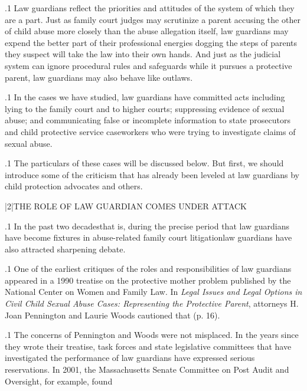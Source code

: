 \documentclass[11pt, twoside]{article}
\begin{document}
{\p.1{%
Law guardians reflect the priorities and attitudes of the system of
which they are a part. Just as family court judges may scrutinize a parent
accusing the other of child abuse more closely than the abuse allegation
itself, law guardians may expend the better part of their professional energies dogging the steps of parents they suspect will take the law into
their own hands. And just as the judicial system can ignore procedural
rules and safeguards while it pursues a protective parent, law guardians
may also behave like outlaws.
}%

\p.1{%
In the cases we have studied, law guardians have committed acts
including lying to the family court and to higher courts; suppressing
evidence of sexual abuse; and communicating false or incomplete information to state prosecutors and child protective service caseworkers
who were trying to investigate claims of sexual abuse.
}%

\p.1{%
The particulars of these cases will be discussed below. But first, we should
introduce some of the criticism that has already been leveled at 
law guardians by child protection advocates and others.
}%


\s|2|{THE ROLE OF LAW GUARDIAN COMES UNDER ATTACK}

\p.1{%
\noindent{}In the past two decades\mdash{}that is, during the precise period that
law guardians have become fixtures in abuse-related family court
litigation\mdash{}law guardians have also attracted sharpening debate.
}%

\p.1{%
One of the earliest critiques of the roles and responsibilities of law
guardians appeared in a 1990 treatise on the protective mother problem published by the National Center on Women and Family Law. In
\textit{Legal Issues and Legal Options in Civil Child Sexual Abuse Cases: Representing the Protective Parent}, attorneys H. Joan Pennington and Laurie
Woods cautioned that  (p. 16).
}%

\p.1{%
The concerns of Pennington and Woods were not misplaced.
In the years since they wrote their
treatise, task forces and state legislative committees that have investigated
the performance of law guardians have expressed serious reservations. In 2001, the Massachusetts Senate Committee on Post Audit and
Oversight, for example, found 
}%

}
\end{document}
